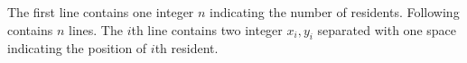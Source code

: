 The first line contains one integer $n$ indicating the number of residents.
Following contains $n$ lines.
The $i$th line contains two integer $x_i,y_i$ separated with one space indicating the position of $i$th resident.

